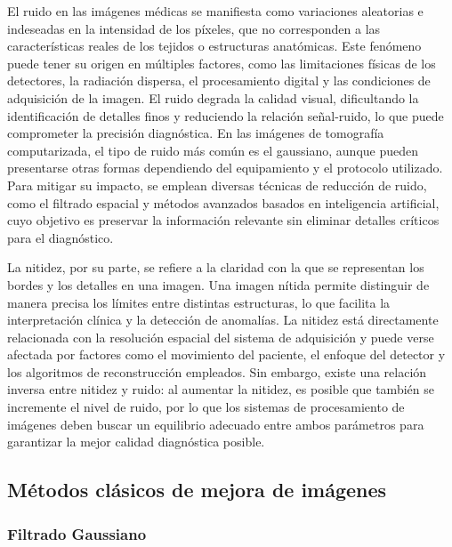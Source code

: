 El ruido en las imágenes médicas se manifiesta como variaciones aleatorias e indeseadas en la intensidad de los píxeles, que no corresponden a las características reales de los tejidos o estructuras anatómicas. Este fenómeno puede tener su origen en múltiples factores, como las limitaciones físicas de los detectores, la radiación dispersa, el procesamiento digital y las condiciones de adquisición de la imagen. El ruido degrada la calidad visual, dificultando la identificación de detalles finos y reduciendo la relación señal-ruido, lo que puede comprometer la precisión diagnóstica. En las imágenes de tomografía computarizada, el tipo de ruido más común es el gaussiano, aunque pueden presentarse otras formas dependiendo del equipamiento y el protocolo utilizado. Para mitigar su impacto, se emplean diversas técnicas de reducción de ruido, como el filtrado espacial y métodos avanzados basados en inteligencia artificial, cuyo objetivo es preservar la información relevante sin eliminar detalles críticos para el diagnóstico.

La nitidez, por su parte, se refiere a la claridad con la que se representan los bordes y los detalles en una imagen. Una imagen nítida permite distinguir de manera precisa los límites entre distintas estructuras, lo que facilita la interpretación clínica y la detección de anomalías. La nitidez está directamente relacionada con la resolución espacial del sistema de adquisición y puede verse afectada por factores como el movimiento del paciente, el enfoque del detector y los algoritmos de reconstrucción empleados. Sin embargo, existe una relación inversa entre nitidez y ruido: al aumentar la nitidez, es posible que también se incremente el nivel de ruido, por lo que los sistemas de procesamiento de imágenes deben buscar un equilibrio adecuado entre ambos parámetros para garantizar la mejor calidad diagnóstica posible.

\subsection{Métodos clásicos de mejora de imágenes}

\subsubsection{Filtrado Gaussiano}

